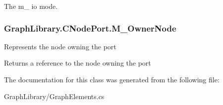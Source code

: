 The m\+\_\+ io mode. \hypertarget{class_graph_library_1_1_c_node_port_ade5210cf6e28999f415591d5d4a02cdf}{}
\subsubsection[{M\+\_\+\+Owner\+Node}]{ Graph\+Library.\+C\+Node\+Port.\+M\+\_\+\+Owner\+Node\hspace{0.3cm}{\ttfamily [get]}}\label{class_graph_library_1_1_c_node_port_ade5210cf6e28999f415591d5d4a02cdf}


Represents the node owning the port 

Returns a reference to the node owning the port 

The documentation for this class was generated from the following file\+:\begin{DoxyCompactItemize}
\item 
Graph\+Library/Graph\+Elements.\+cs\end{DoxyCompactItemize}
